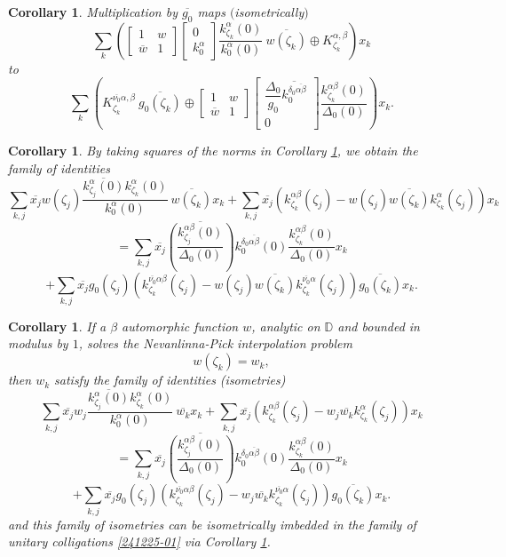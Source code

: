 \documentclass[reqno,11pt,centertags]{article}
\newcommand{\bbD}{{\mathbb{D}}}
\newcommand{\z}{\zeta}
\newtheorem{corollary}[theorem]{Corollary}
\theoremstyle{definition}
\def\be{\begin{equation}}
\def\ee{\end{equation}}
\def\a{\alpha}
\def\b{\beta}
\def\d{\delta}
\def\D{\Delta}
\def\z{\zeta}
\begin{document}
\begin{corollary}\label{250112-01}
Multiplication by $\overline{g_0}$ maps $($isometrically$)$
$$
\sum\limits_k
\left(
\begin{bmatrix}
1 & w \\
\overline{w} & 1
\end{bmatrix}
\begin{bmatrix}
0
\\
k^\a_0
\end{bmatrix}
\dfrac{k^\a_{\z_k}(0)}{k^\a_0(0)}
\ \overline{w(\zeta_k)}
\oplus
K_{\zeta_k}^{\alpha, \beta}
\right)
x_k
$$
to
$$
\sum\limits_k
\left(
K_{\zeta_k}^{\overline{\nu_0}\alpha, \beta}
\ \overline{g_0(\z_k)}
\oplus
\begin{bmatrix}
1 & w \\
\overline{w} & 1
\end{bmatrix}
\begin{bmatrix}
\dfrac{\D_0}{g_0}\overline{k^{\d_0\overline{\alpha\b}}_0}
\\
0
\end{bmatrix}
\dfrac{k^{\a\b}_{\z_k}(0)}{\D_0(0)}
\right)x_k
.
$$
\end{corollary}
\begin{corollary}\label{250112-02}
By taking squares of the norms in Corollary \ref{250112-01}, we obtain the family of identities
$$
\sum\limits_{k,j}
\overline{x_j}
w(\z_j)
\dfrac{\overline{k^\a_{\z_j}(0)}k^\a_{\z_k}(0)}{k^\a_0(0)}
\ \overline{w(\zeta_k)}
x_k
+
\sum\limits_{k,j}
\overline{x_j}
\left(
k^{\alpha\beta}_{\z_k}(\zeta_j)-w(\zeta_j)\overline{w(\z_k)} k^\alpha_{\z_k}(\zeta_j)
\right)
x_k
$$
$$
=
\sum\limits_{k,j}
\overline{x_j}
\overline{\left(\dfrac{k^{\a\b}_{\z_j}(0)}{\D_0(0)}\right)}
k^{\d_0\overline{\alpha\b}}_0(0)
\dfrac{k^{\a\b}_{\z_k}(0)}{\D_0(0)}
x_k
$$
$$
+
\sum\limits_{k,j}
\overline{x_j}g_0(\z_j)
\left(
k^{\overline{\nu_0}\alpha\beta}_{\z_k}(\zeta_j)-w(\zeta_j)\overline{w(\z_k)} k^{\overline{\nu_0}\alpha}_{\z_k}(\zeta_j)
\right)
\overline{g_0(\z_k)}
x_k .
$$
\end{corollary}
\begin{corollary}
If a $\b$ automorphic function $w$, analytic on $\bbD$  and bounded in modulus by $1$, solves the Nevanlinna-Pick interpolation problem
\be\label{260227_01}
w(\z_k)=w_k,
\ee
then $w_k$ satisfy the family of identities (isometries)
$$
\sum\limits_{k,j}
\overline{x_j}
w_j
\dfrac{\overline{k^\a_{\z_j}(0)}k^\a_{\z_k}(0)}{k^\a_0(0)}
\ \overline{w_k}
x_k
+
\sum\limits_{k,j}
\overline{x_j}
\left(
k^{\alpha\beta}_{\z_k}(\zeta_j)-w_j\overline{w_k} k^\alpha_{\z_k}(\zeta_j)
\right)
x_k
$$
$$
=
\sum\limits_{k,j}
\overline{x_j}
\overline{\left(\dfrac{k^{\a\b}_{\z_j}(0)}{\D_0(0)}\right)}
k^{\d_0\overline{\alpha\b}}_0(0)
\dfrac{k^{\a\b}_{\z_k}(0)}{\D_0(0)}
x_k
$$
$$
+
\sum\limits_{k,j}
\overline{x_j}g_0(\z_j)
\left(
k^{\overline{\nu_0}\alpha\beta}_{\z_k}(\zeta_j)-w_j\overline{w_k} k^{\overline{\nu_0}\alpha}_{\z_k}(\zeta_j)
\right)
\overline{g_0(\z_k)}
x_k .
$$
and this family of isometries can be isometrically imbedded in the family of unitary colligations \eqref{241225-01}
via Corollary \ref{250112-01}.
\end{corollary}
\end{document}
